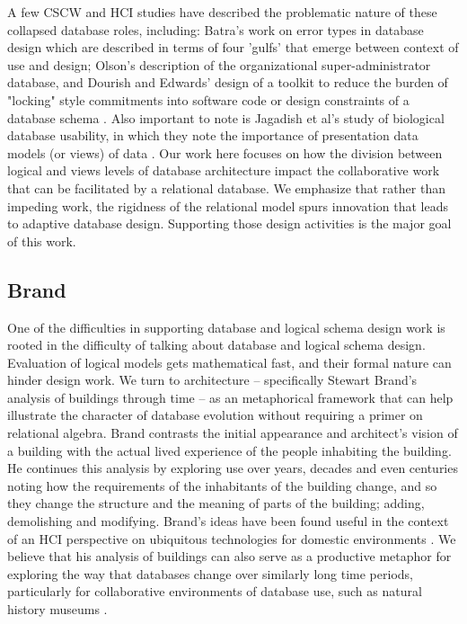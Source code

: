 A few CSCW and HCI studies have described the problematic nature of these collapsed database roles, including: Batra's work on error types in database design \cite{Batra_1993} which are described in terms of  four 'gulfs' that emerge between context of use and design; Olson's description of the organizational super-administrator \cite{olson2010database} database, and Dourish and Edwards' design of a toolkit to reduce the burden of "locking" style commitments into software code or design constraints of a database schema \cite{Dourish_2000}. Also important to note is Jagadish et al's study of biological database usability, in which they note the importance of presentation data models (or views) of data \cite{jagadish2007making}. Our work here focuses on how the division between logical and views levels of database architecture impact the collaborative work that can be facilitated by a relational database. We emphasize that rather than impeding work, the rigidness of the relational model spurs innovation that leads to adaptive database design. Supporting those design activities is the major goal of this work. 

\subsection{Brand}

One of the difficulties in supporting database and logical schema design work is rooted in the difficulty of talking about database and logical schema design. Evaluation of logical models gets mathematical fast, and their formal nature can hinder design work. We turn to architecture -- specifically Stewart Brand’s analysis of buildings through time \cite{brand1995buildings} -- as an metaphorical framework that can help illustrate the character of database evolution without requiring a primer on relational algebra. Brand contrasts the initial appearance and architect’s vision of a building with the actual lived experience of the people inhabiting the building. He continues this analysis by exploring use over years, decades and even centuries noting how the requirements of the inhabitants of the building change, and so they change the structure and the meaning of parts of the building; adding, demolishing and modifying. Brand’s ideas have been found useful in the context of an HCI perspective on ubiquitous technologies for domestic environments \cite{rodden2003evolution}. We believe that his analysis of buildings can also serve as a productive metaphor for exploring the way that databases change over similarly long time periods, particularly for collaborative environments of database use, such as natural history museums \cite{thomer2014databases}. 

